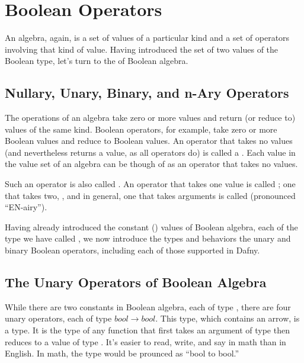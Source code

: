 \documentclass[letterpaper,10pt,english]{sphinxmanual}
\begin{document}
\section{Boolean Operators}
\label{\detokenize{09-boolean-algebra:boolean-operators}}
An algebra, again, is a set of values of a particular kind and a set
of operators involving that kind of value. Having introduced the set
of two values of the Boolean type, let’s turn to the  of
Boolean algebra.


\subsection{Nullary, Unary, Binary, and n-Ary Operators}
\label{\detokenize{09-boolean-algebra:nullary-unary-binary-and-n-ary-operators}}
The operations of an algebra take zero or more values and return (or
reduce to) values of the same kind. Boolean operators, for example,
take zero or more Boolean values and reduce to Boolean values. An
operator that takes no values (and nevertheless returns a value, as
all operators do) is called a . Each value in the value set
of an algebra can be though of as an operator that takes no values.

Such an operator is also called . An operator that takes one
value is called ; one that takes two, , and in general,
one that takes  arguments is called  (pronounced “EN-airy”).

Having already introduced the constant () values of Boolean
algebra, each of the type we have called , we now introduce the
types and behaviors the unary and binary Boolean operators, including
each of those supported in Dafny.


\subsection{The Unary Operators of Boolean Algebra}
\label{\detokenize{09-boolean-algebra:the-unary-operators-of-boolean-algebra}}
While there are two constants in Boolean algebra, each of type ,
there are four unary operators, each of type \(bool \rightarrow
bool\). This type, which contains an arrow, is a  type. It is
the type of any function that first takes an argument of type 
then reduces to a value of type . It’s easier to read, write,
and say in math than in English. In math, the type would be prounced
as “bool to bool.”
\end{document}
